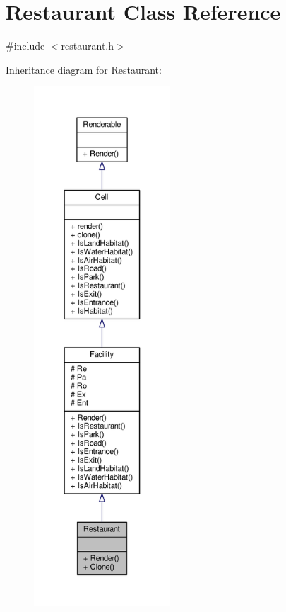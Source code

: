 \hypertarget{classRestaurant}{}\section{Restaurant Class Reference}
\label{classRestaurant}


{\ttfamily \#include $<$restaurant.\+h$>$}



Inheritance diagram for Restaurant\+:
\nopagebreak
\begin{figure}[H]
\begin{center}
\leavevmode
\includegraphics[height=550pt]{classRestaurant__inherit__graph}
\end{center}
\end{figure}


